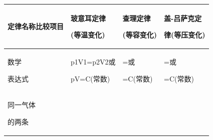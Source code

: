 \begin{longtable}[]{@{}llll@{}}
\toprule
\begin{minipage}[b]{0.22\columnwidth}\raggedright
定律名称比较项目\strut
\end{minipage} & \begin{minipage}[b]{0.22\columnwidth}\raggedright
玻意耳定律

(等温变化)\strut
\end{minipage} & \begin{minipage}[b]{0.22\columnwidth}\raggedright
查理定律

(等容变化)\strut
\end{minipage} & \begin{minipage}[b]{0.22\columnwidth}\raggedright
盖-吕萨克定

律(等压变化)\strut
\end{minipage}\tabularnewline
\midrule
\endhead
\begin{minipage}[t]{0.22\columnwidth}\raggedright
数学

表达式\strut
\end{minipage} & \begin{minipage}[t]{0.22\columnwidth}\raggedright
p1V1=p2V2或

pV=C(常数)\strut
\end{minipage} & \begin{minipage}[t]{0.22\columnwidth}\raggedright
=或

=C(常数)\strut
\end{minipage} & \begin{minipage}[t]{0.22\columnwidth}\raggedright
=或

=C(常数)\strut
\end{minipage}\tabularnewline
\begin{minipage}[t]{0.22\columnwidth}\raggedright
同一气体

的两条


\end{minipage}
\end{longtable}
